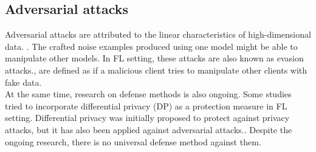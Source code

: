  \subsection{ Adversarial attacks }
Adversarial attacks are attributed to the linear characteristics of high-dimensional data. \cite{goodfellow2014explaining}. The crafted noise examples produced using one model might be able to manipulate other models. In FL setting, these attacks are also known as evasion attacks.\cite{biggio2013evasion,costa2021covert,ayub2020model,bouacida2021vulnerabilities}, are defined as if a malicious client tries to manipulate other clients with fake data.\\
At the same time, research on defense methods is also ongoing. Some studies tried to incorporate differential privacy (DP) as a protection measure in FL setting. Differential privacy was initially proposed to protect against privacy attacks, but it has also been applied against adversarial attacks.\cite{bouacida2021vulnerabilities,asgari2018vulnerability,wu2020evaluation}. Despite the ongoing research, there is no universal defense method against them.

